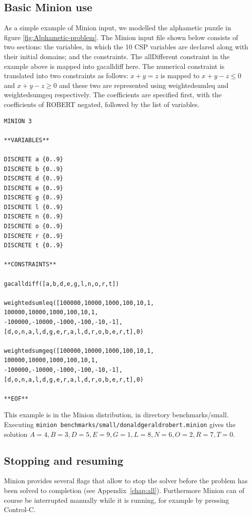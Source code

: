 \documentclass[oneside]{book}
\begin{document}
\subsection{Basic Minion use}

As a simple example of Minion input, we modelled the alphametic puzzle
in figure \ref{fig:Alphametic-problem}. The Minion input file shown
below consists of two sections: the variables, in which the 10 CSP
variables are declared along with their initial domains; and the constraints.
The allDifferent constraint in the example above is mapped into gacalldiff
here. The numerical constraint is translated into two constraints
as follows: $x+y=z$ is mapped to $x+y-z\le0$ and $x+y-z\ge0$ and
these two are represented using weightedsumleq and weightedsumgeq
respectively. The coefficients are specified first, with the coefficients
of ROBERT negated, followed by the list of variables.

\begin{verbatim}
MINION 3

**VARIABLES**

DISCRETE a {0..9}
DISCRETE b {0..9}
DISCRETE d {0..9}
DISCRETE e {0..9}
DISCRETE g {0..9}
DISCRETE l {0..9}
DISCRETE n {0..9}
DISCRETE o {0..9}
DISCRETE r {0..9}
DISCRETE t {0..9}

**CONSTRAINTS**

gacalldiff([a,b,d,e,g,l,n,o,r,t])

weightedsumleq([100000,10000,1000,100,10,1,
100000,10000,1000,100,10,1,
-100000,-10000,-1000,-100,-10,-1],
[d,o,n,a,l,d,g,e,r,a,l,d,r,o,b,e,r,t],0)

weightedsumgeq([100000,10000,1000,100,10,1,
100000,10000,1000,100,10,1,
-100000,-10000,-1000,-100,-10,-1],
[d,o,n,a,l,d,g,e,r,a,l,d,r,o,b,e,r,t],0)

**EOF**
\end{verbatim}

This example is in the Minion distribution, in directory benchmarks/small.
Executing \texttt{minion benchmarks/small/donaldgeraldrobert.minion}
gives the solution $A=4, B=3, D=5, E=9, G=1,
L=8, N=6, O=2, R=7, T=0.$

\subsection{Stopping and resuming}

Minion provides several flags that allow to stop the solver before the problem
has been solved to completion (see Appendix~\ref{chap:all}). Furthermore Minion
can of course be interrupted manually while it is running, for example by
pressing Control-C.
\end{document}
